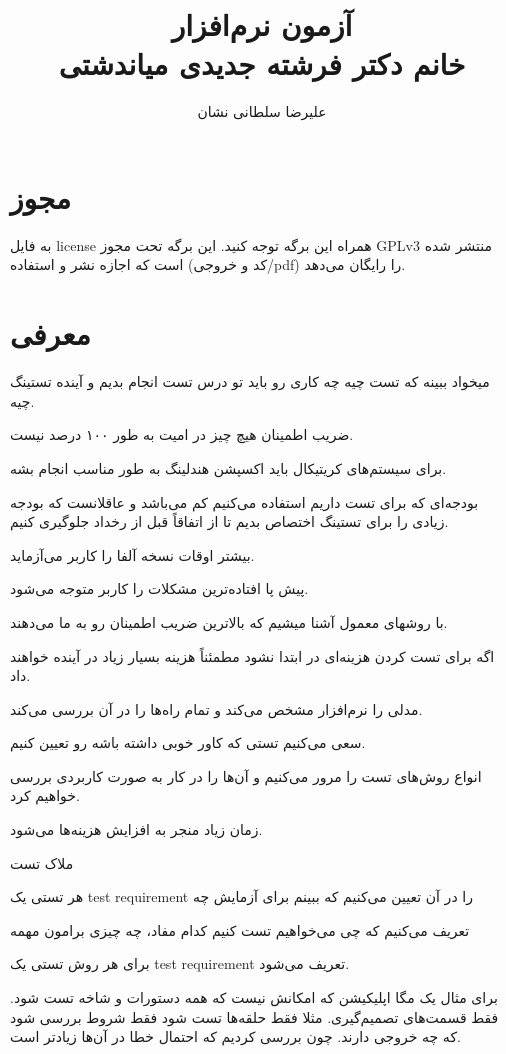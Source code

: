 \documentclass[a4paper]{article}
\title{آزمون نرم‌افزار \\ خانم دکتر فرشته جدیدی میاندشتی}
\author{علیرضا سلطانی نشان}
\begin{document}
\maketitle
\tableofcontents

\section*{مجوز}

به فایل license همراه این برگه توجه کنید. این برگه تحت مجوز GPLv3 منتشر شده است
که اجازه نشر و استفاده (کد و خروجی/pdf) را رایگان می‌دهد.

\section{معرفی}

میخواد ببینه که تست چیه چه کاری رو باید تو درس تست انجام بدیم و آینده تستینگ
چیه.

ضریب اطمینان
هیچ چیز در امیت به طور ۱۰۰ درصد نیست.

برای سیستم‌های کریتیکال باید اکسپشن هندلینگ به طور مناسب انجام بشه.

بودجه‌ای که برای تست داریم استفاده می‌کنیم کم می‌باشد و عاقلانست که بودجه زیادی
را برای تستینگ اختصاص بدیم تا از اتفاقاً قبل از رخداد جلوگیری کنیم.

بیشتر اوقات نسخه آلفا را کاربر می‌آزماید.

پیش پا افتاده‌ترین مشکلات را کاربر متوجه می‌شود.

با روشهای معمول آشنا میشیم که بالاترین ضریب اطمینان رو به ما می‌دهند.

اگه برای تست کردن هزینه‌ای در ابتدا نشود مطمئناً هزینه بسیار زیاد در آینده
خواهند داد.

مدلی را نرم‌افزار مشخص می‌کند و تمام راه‌ها را در آن بررسی می‌کند.

سعی می‌کنیم تستی که کاور خوبی داشته باشه رو تعیین کنیم.

انواع روش‌های تست را مرور می‌کنیم و آن‌ها را در کار به صورت کاربردی بررسی خواهیم
کرد.

زمان زیاد منجر به افزایش هزینه‌ها می‌شود.

ملاک تست

هر تستی یک test requirement را در آن تعیین می‌کنیم که ببینم برای آزمایش چه 

تعریف می‌کنیم که چی می‌خواهیم تست کنیم کدام مفاد، چه چیزی برامون مهمه

برای هر روش تستی یک test requirement تعریف می‌شود.

برای مثال یک مگا اپلیکیشن که امکانش نیست که همه دستورات و شاخه تست شود. فقط
قسمت‌های تصمیم‌گیری. مثلا فقط حلقه‌ها تست شود فقط شروط بررسی شود که چه خروجی
دارند. چون بررسی کردیم که احتمال خطا در آن‌ها زیاد‌تر است.
\end{document}
